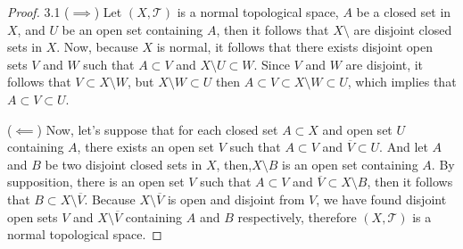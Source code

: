 \documentclass[11pt]{amsart}
\begin{document}
\begin{proof}

3.1 ($\implies$) Let $(X,\mathcal{T})$ is a normal topological space, $A$ be a closed set in $X$, and $U$ be an open set containing $A$, then it follows that $X\setminus$ are disjoint closed sets in $X$. Now, because $X$ is normal, it follows that there exists disjoint open sets $V$ and $W$ such that $A\subset V$ and $X\setminus U\subset W$. Since $V$ and $W$ are disjoint, it follows that $V\subset X\setminus W$, but $X\setminus W\subset U$ then $A\subset V\subset X\setminus W\subset U$, which implies that $A\subset V\subset U$.

($\impliedby$)
Now, let's suppose that for each closed set $A\subset X$ and open set $U$ containing $A$, there exists an open set $V$ such that $A\subset V$ and  $\overline{V} \subset U$. And let $A$ and $B$ be two disjoint closed sets in $X$, then,$X\setminus B$ is an open set containing $A$. By supposition, there is an open set $V$ such that $A\subset V$ and $\overline{V} \subset X\setminus B$, then it follows that $B\subset X\setminus \overline{V}$. Because $X\setminus \overline{V}$ is open and disjoint from $V$, we have found disjoint open sets $V$ and $X\setminus \overline{V}$ containing $A$ and $B$ respectively, therefore $(X,\mathcal{T})$ is a normal topological space.








\end{proof}
\end{document}
